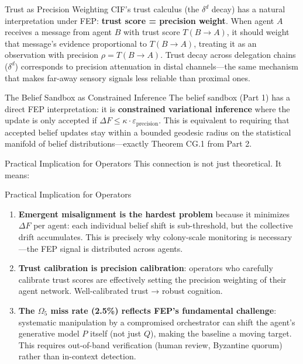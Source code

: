\documentclass[
  ignorenonframetext,
]{beamer}
\providecommand{\tightlist}{%
  \setlength{\itemsep}{0pt}\setlength{\parskip}{0pt}}
\begin{document}
\begin{frame}[allowframebreaks]{Trust as Precision Weighting}
\protect{}\label{trust-as-precision-weighting}
CIF's trust calculus (the \(\delta^d\) decay) has a natural
interpretation under FEP: \textbf{trust score = precision weight}. When
agent \(A\) receives a message from agent \(B\) with trust score
\(T(B \to A)\), it should weight that message's evidence proportional to
\(T(B \to A)\), treating it as an observation with precision
\(\rho = T(B \to A)\). Trust decay across delegation chains
(\(\delta^d\)) corresponds to precision attenuation in distal
channels---the same mechanism that makes far-away sensory signals less
reliable than proximal ones.
\end{frame}

\begin{frame}[allowframebreaks]{The Belief Sandbox as Constrained
Inference}
\protect{}\label{the-belief-sandbox-as-constrained-inference}
The belief sandbox (Part 1) has a direct FEP interpretation: it is
\textbf{constrained variational inference} where the update is only
accepted if \(\Delta F \leq \kappa \cdot \varepsilon_\text{precision}\).
This is equivalent to requiring that accepted belief updates stay within
a bounded geodesic radius on the statistical manifold of belief
distributions---exactly Theorem CG.1 from Part 2.
\end{frame}

\begin{frame}[allowframebreaks]{Practical Implication for Operators}
\protect{}\label{practical-implication-for-operators}
This connection is not just theoretical. It means:

\end{frame}

\begin{frame}[allowframebreaks]{Practical Implication for Operators}
\begin{enumerate}
\tightlist
\item
  \textbf{Emergent misalignment is the hardest problem} because it
  minimizes \(\Delta F\) per agent: each individual belief shift is
  sub-threshold, but the collective drift accumulates. This is precisely
  why colony-scale monitoring is necessary---the FEP signal is
  distributed across agents.
\item
  \textbf{Trust calibration is precision calibration}: operators who
  carefully calibrate trust scores are effectively setting the precision
  weighting of their agent network. Well-calibrated trust → robust
  cognition.
\item
  \textbf{The \(\Omega_5\) miss rate (2.5\%) reflects FEP's fundamental
  challenge}: systematic manipulation by a compromised orchestrator can
  shift the agent's generative model \(P\) itself (not just \(Q\)),
  making the baseline a moving target. This requires out-of-band
  verification (human review, Byzantine quorum) rather than in-context
  detection.
\end{enumerate}

\end{frame}
\end{document}
